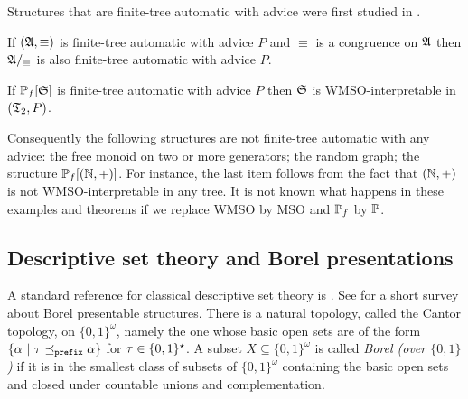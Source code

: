 Structures that are finite-tree automatic with advice were first studied in \cite{CoLo07}.

\begin{theorem} \cite{CoLo07}
If $(\mathfrak{A},\equiv)$ is finite-tree automatic with advice $P$ and $\equiv$ is a congruence on $\mathfrak{A}$ then $\mathfrak{A}/_\equiv$ is also finite-tree automatic with advice $P$.
\end{theorem}

\begin{theorem} \cite{CoLo07} \label{AS:thm:colo}
If ${\mathbb P}_f[\mathfrak{S}]$ is finite-tree automatic with advice $P$ then $\mathfrak{S}$ is WMSO-interpretable in $(\mathfrak{T}_2,P)$.
\end{theorem}

Consequently the following structures are not finite-tree automatic with any advice: the free monoid on two or more generators; the random graph; the structure ${\mathbb P}_f[(\mathbb{N},+)]$. For instance, the last item follows from the fact that $(\mathbb{N},+)$ is not WMSO-interpretable in any tree. It is not known what happens in these examples and theorems if we replace WMSO by MSO and ${\mathbb P}_f$ by ${\mathbb P}$.

\subsection{Descriptive set theory and Borel presentations}

A standard reference for classical descriptive set theory is \cite{Kech95}. See \cite{NiMo11} for a short survey about Borel presentable structures.
There is a natural topology, called the Cantor topology, on $\{0,1\}^\omega$, namely the one whose basic open
sets are of the form $\{\alpha \ \vert \  \tau \preceq_{\tt prefix} \alpha\}$ for $\tau \in \{0,1\}^\star$.  A subset $X \subseteq \{0,1\}^\omega$ is called {\em Borel (over $\{0,1\}$)} if it is in the smallest
class of subsets of $\{0,1\}^\omega$ containing the basic open sets and closed under
countable unions and complementation. 

